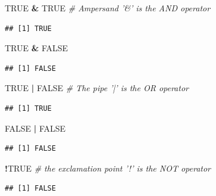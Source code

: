 \documentclass[]{article}
\newenvironment{Shaded}{\begin{snugshade}}{\end{snugshade}}
\newcommand{\StringTok}[1]{\textcolor[rgb]{0.31,0.60,0.02}{#1}}
\newcommand{\CommentTok}[1]{\textcolor[rgb]{0.56,0.35,0.01}{\textit{#1}}}
\newcommand{\OtherTok}[1]{\textcolor[rgb]{0.56,0.35,0.01}{#1}}
\newcommand{\OperatorTok}[1]{\textcolor[rgb]{0.81,0.36,0.00}{\textbf{#1}}}
\begin{document}
\begin{Shaded}
\begin{Highlighting}[]
\OtherTok{TRUE} \OperatorTok{&}\StringTok{ }\OtherTok{TRUE}  \CommentTok{# Ampersand '&' is the AND operator}
\end{Highlighting}
\end{Shaded}

\begin{verbatim}
## [1] TRUE
\end{verbatim}

\begin{Shaded}
\begin{Highlighting}[]
\OtherTok{TRUE} \OperatorTok{&}\StringTok{ }\OtherTok{FALSE}
\end{Highlighting}
\end{Shaded}

\begin{verbatim}
## [1] FALSE
\end{verbatim}

\begin{Shaded}
\begin{Highlighting}[]
\OtherTok{TRUE} \OperatorTok{|}\StringTok{ }\OtherTok{FALSE}  \CommentTok{# The pipe '|' is the OR operator}
\end{Highlighting}
\end{Shaded}

\begin{verbatim}
## [1] TRUE
\end{verbatim}

\begin{Shaded}
\begin{Highlighting}[]
\OtherTok{FALSE} \OperatorTok{|}\StringTok{ }\OtherTok{FALSE}
\end{Highlighting}
\end{Shaded}

\begin{verbatim}
## [1] FALSE
\end{verbatim}

\begin{Shaded}
\begin{Highlighting}[]
\OperatorTok{!}\OtherTok{TRUE}  \CommentTok{# the exclamation point '!' is the NOT operator}
\end{Highlighting}
\end{Shaded}

\begin{verbatim}
## [1] FALSE
\end{verbatim}
\end{document}
